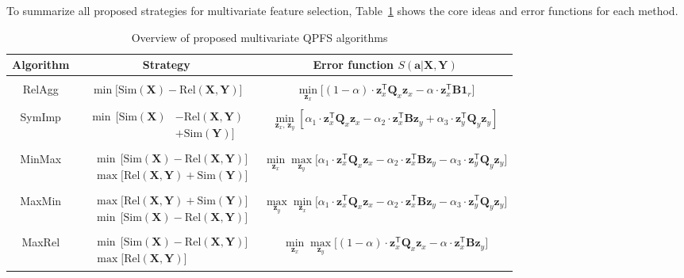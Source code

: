\documentclass[12pt,twoside]{article}
\theoremstyle{definition}
\newcommand{\ba}{\mathbf{a}}
\newcommand{\bz}{\mathbf{z}}
\newcommand{\bY}{\mathbf{Y}}
\newcommand{\bX}{\mathbf{X}}
\newcommand{\bB}{\mathbf{B}}
\newcommand{\bQ}{\mathbf{Q}}
\newcommand{\T}{\mathsf{T}}
\newcommand{\bOne}{\boldsymbol{1}}
\begin{document}
To summarize all proposed strategies for multivariate feature selection, Table~\ref{tbl:summary} shows the core ideas and error functions for each method. 

\begin{table}
	\centering
	\small{
	\begin{tabular}{c|c|c}
		\hline
		Algorithm & Strategy & Error function $S(\ba | \bX, \bY)$ \\
		\hline && \\ [-.5em]
		RelAgg & $\min \bigl[ \text{Sim}(\bX) - \text{Rel}(\bX, \bY) \bigr] $ & $\min\limits_{\bz_x} \bigl[ (1 - \alpha) \cdot \bz_x^{\T} \bQ_x \bz_x - \alpha \cdot \bz_x^{\T} \bB \bOne_r \bigr] $ \\ &&\\[-.5em]
		SymImp & $\begin{aligned} \min \, \bigl[ \text{Sim}(\bX) & - \text{Rel}(\bX, \bY) \\ & + \text{Sim}(\bY) \bigr] \end{aligned}$ & $ \min\limits_{\bz_x, \, \bz_y} \left[ \alpha_1 \cdot \bz_x^{\T} \bQ_x \bz_x - \alpha_2 \cdot \bz_x^{\T} \bB \bz_y + \alpha_3 \cdot \bz_y^{\T} \bQ_y \bz_y \right] $\\ &&\\ [-.5em]
		MinMax & $\begin{aligned} &\min \, \bigl[ \text{Sim}(\bX) - \text{Rel}(\bX, \bY) \bigr]  \\ & \max \bigl[\text{Rel}(\bX, \bY) + \text{Sim}(\bY) \bigr] \end{aligned}$ & $	\min\limits_{\bz_x} 	\max\limits_{\bz_y} \bigl[\alpha_1 \cdot \bz_x^{\T} \bQ_x \bz_x - \alpha_2 \cdot \bz_x^{\T} \bB \bz_y - \alpha_3 \cdot \bz_y^{\T} \bQ_y \bz_y \bigr]$ \\ &&\\ 
		MaxMin & $\begin{aligned} &\max \bigl[\text{Rel}(\bX, \bY) + \text{Sim}(\bY) \bigr] \\ & \min \, \bigl[ \text{Sim}(\bX) - \text{Rel}(\bX, \bY) \bigr]  \end{aligned}$ & $\max\limits_{\bz_y} \min\limits_{\bz_x} \bigl[\alpha_1 \cdot \bz_x^{\T} \bQ_x \bz_x - \alpha_2 \cdot \bz_x^{\T} \bB \bz_y - \alpha_3 \cdot \bz_y^{\T} \bQ_y \bz_y \bigr]$\\ &&\\ [-.5em]
		MaxRel & $\begin{aligned} &\min \, \bigl[ \text{Sim}(\bX) - \text{Rel}(\bX, \bY) \bigr]  \\ & \max \bigl[\text{Rel}(\bX, \bY) \bigr] \end{aligned}$& $\min\limits_{\bz_x} 	\max\limits_{\bz_y} \bigl[ (1 - \alpha) \cdot \bz_x^{\T} \bQ_x \bz_x - \alpha \cdot \bz_x^{\T} \bB \bz_y \bigr]$ \\ 
		\hline
	\end{tabular}}
	\caption{Overview of proposed multivariate QPFS algorithms}
	\label{tbl:summary}
\end{table}
\end{document}
